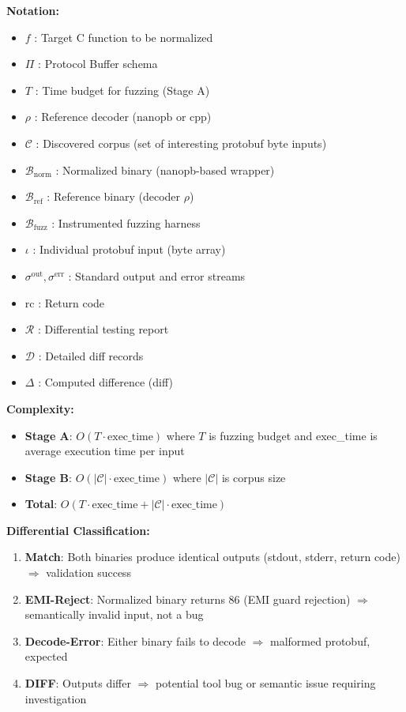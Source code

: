 \vspace{0.5cm}

\textbf{Notation:}
\begin{itemize}
    \item $f$ : Target C function to be normalized
    \item $\Pi$ : Protocol Buffer schema
    \item $T$ : Time budget for fuzzing (Stage A)
    \item $\rho$ : Reference decoder ($\text{nanopb}$ or $\text{cpp}$)
    \item $\mathcal{C}$ : Discovered corpus (set of interesting protobuf byte inputs)
    \item $\mathcal{B}_{\text{norm}}$ : Normalized binary (nanopb-based wrapper)
    \item $\mathcal{B}_{\text{ref}}$ : Reference binary (decoder $\rho$)
    \item $\mathcal{B}_{\text{fuzz}}$ : Instrumented fuzzing harness
    \item $\iota$ : Individual protobuf input (byte array)
    \item $\sigma^{\text{out}}, \sigma^{\text{err}}$ : Standard output and error streams
    \item $\text{rc}$ : Return code
    \item $\mathcal{R}$ : Differential testing report
    \item $\mathcal{D}$ : Detailed diff records
    \item $\Delta$ : Computed difference (diff)
\end{itemize}

\textbf{Complexity:}
\begin{itemize}
    \item \textbf{Stage A}: $O(T \cdot \text{exec\_time})$ where $T$ is fuzzing budget and exec\_time is average execution time per input
    \item \textbf{Stage B}: $O(|\mathcal{C}| \cdot \text{exec\_time})$ where $|\mathcal{C}|$ is corpus size
    \item \textbf{Total}: $O(T \cdot \text{exec\_time} + |\mathcal{C}| \cdot \text{exec\_time})$
\end{itemize}

\textbf{Differential Classification:}
\begin{enumerate}
    \item \textbf{Match}: Both binaries produce identical outputs (stdout, stderr, return code) $\Rightarrow$ validation success
    \item \textbf{EMI-Reject}: Normalized binary returns 86 (EMI guard rejection) $\Rightarrow$ semantically invalid input, not a bug
    \item \textbf{Decode-Error}: Either binary fails to decode $\Rightarrow$ malformed protobuf, expected
    \item \textbf{DIFF}: Outputs differ $\Rightarrow$ potential tool bug or semantic issue requiring investigation
\end{enumerate}

